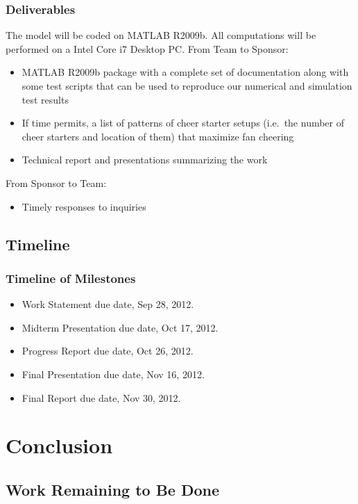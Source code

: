 \documentclass[compress,handout,10pt]{beamer}
\let\olditem\item
\renewcommand{\item}{\setlength{\itemsep}{0.5\baselineskip}\olditem}
\begin{document}
\begin{frame}
	\frametitle{Deliverables}
	The model will be coded on MATLAB R2009b. All computations will be performed on a Intel Core i7 Desktop PC. \newline
	\newline
	From Team to Sponsor:
	\begin {itemize}
	\item MATLAB R2009b package with a complete set of documentation along with some test scripts that can be used to reproduce our numerical and simulation test results
	\item If time permits, a list of patterns of cheer starter setups (i.e.~the number of cheer starters and location of them) that maximize fan cheering
	\item Technical report and presentations summarizing the work \newline
	\end{itemize}
	From Sponsor to Team:
	\begin{itemize}
		\item Timely responses to inquiries
	\end{itemize}
\end{frame}

\subsection{Timeline}

\begin{frame}
	\frametitle{Timeline of Milestones}
	\begin{itemize}
    \item Work Statement due date, Sep 28, 2012.
    \item Midterm Presentation due date, Oct 17, 2012.
    \item Progress Report due date, Oct 26, 2012.
    \item Final Presentation due date, Nov 16, 2012.
    \item Final Report due date, Nov 30, 2012.
	\end{itemize}
\end{frame}

\section{Conclusion}

\subsection{Work Remaining to Be Done}
\end{document}
